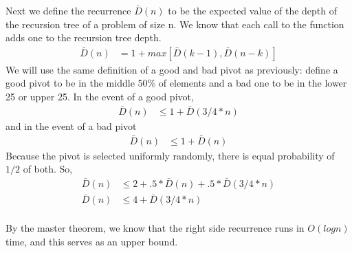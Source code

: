 \documentclass[11pt]{article}
\begin{document}
\begin{solution}
Next we define the recurrence $\bar{D}(n)$ to be the expected value of the depth of the recursion tree of a problem of size n. We know that each call to the function adds one to the recursion tree depth.
\begin{align*}
\bar{D}(n) &= 1 + max[\bar{D}(k-1), \bar{D}(n-k)]
\end{align*}
We will use the same definition of a good and bad pivot as previously: define a good pivot to be in the middle 50\% of elements and a bad one to be in the lower 25 or upper 25.  In the event of a good pivot,
\begin{align*}
\bar{D}(n) &\leq 1 + \bar{D}(3/4 * n)
\end{align*}
and in the event of a bad pivot
\begin{align*}
\bar{D}(n) &\leq 1 + \bar{D}(n)
\end{align*}
Because the pivot is selected uniformly randomly, there is equal probability of $1/2$ of both. So,
\begin{align*}
\bar{D}(n) &\leq 2 + .5*\bar{D}(n) + .5*\bar{D}(3/4 * n) \\
\bar{D}(n) &\leq 4 + \bar{D}(3/4 * n)
\end{align*}
\\ By the master theorem, we know that the right side recurrence runs in $O(logn)$ time, and this serves as an upper bound.

\end{solution}
\end{document}
